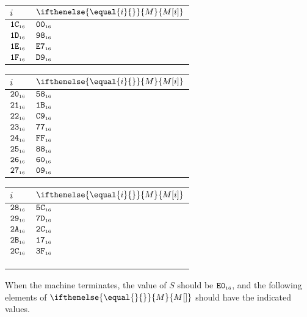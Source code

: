 \documentclass[a4paper,12pt]{article}
\makeatletter
\newcommand{\num}[1]{\texttt{#1}}
\newcommand{\hex}[1]{\num{#1}_{\textup{\tiny 16}}}
\newcommand{\MEM}[1]{\ifthenelse{\equal{#1}{}}{M}{M[#1]}}
\newcommand{\SP}{S}
\newenvironment{memtable}{%
  \begin{trivlist}
    \item
    }{%
    \end{trivlist}}
\newenvironment{memcolumn}{%
  \begin{tabular}{@{}ll@{}}
    $i$ & $\MEM{i}$ \\
    \hline}
    {%
    \hline
  \end{tabular}}
\newcommand{\memspace}{\qquad}
\makeatother
\begin{document}
\begin{memtable}
\begin{memcolumn}
    $\hex{1C}$ & $\hex{00}$ \\
    $\hex{1D}$ & $\hex{98}$ \\
    $\hex{1E}$ & $\hex{E7}$ \\
    $\hex{1F}$ & $\hex{D9}$ \\
  \end{memcolumn}
  \memspace
  \begin{memcolumn}
    $\hex{20}$ & $\hex{58}$ \\
    $\hex{21}$ & $\hex{1B}$ \\
    $\hex{22}$ & $\hex{C9}$ \\
    $\hex{23}$ & $\hex{77}$ \\
    $\hex{24}$ & $\hex{FF}$ \\
    $\hex{25}$ & $\hex{88}$ \\
    $\hex{26}$ & $\hex{60}$ \\
    $\hex{27}$ & $\hex{09}$ \\
  \end{memcolumn}
  \memspace
  \begin{memcolumn}
    $\hex{28}$ & $\hex{5C}$ \\
    $\hex{29}$ & $\hex{7D}$ \\
    $\hex{2A}$ & $\hex{2C}$ \\
    $\hex{2B}$ & $\hex{17}$ \\
    $\hex{2C}$ & $\hex{3F}$ \\
    \\
    \\
    \\
  \end{memcolumn}
\end{memtable}
When the machine terminates, the value of $\SP$ should be $\hex{E0}$, and the following elements of $\MEM{}$ should have the indicated values.
\end{document}
